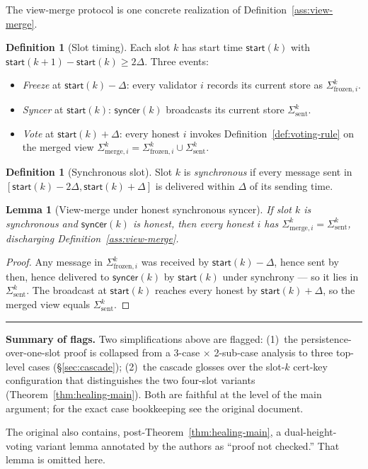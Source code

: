 \documentclass{article}
\newcommand{\start}{\mathsf{start}}
\newcommand{\syncer}{\mathsf{syncer}}
\theoremstyle{plain}
\newtheorem{lemma}[theorem]{Lemma}
\theoremstyle{definition}
\newtheorem{definition}[theorem]{Definition}
\theoremstyle{remark}
\renewcommand{\paragraph}[1]{\vspace{6pt}\noindent\textbf{#1}}
\begin{document}
The view-merge protocol is one concrete realization of Definition~\ref{ass:view-merge}.

\begin{definition}[Slot timing]\label{def:slot-timing}
Each slot $k$ has start time $\start(k)$ with $\start(k+1) - \start(k) \geq 2\Delta$. Three events:
\begin{itemize}
\item \emph{Freeze} at $\start(k) - \Delta$: every validator $i$ records its current store as $\Sigma^k_{\mathrm{frozen}, i}$.
\item \emph{Syncer} at $\start(k)$: $\syncer(k)$ broadcasts its current store $\Sigma^k_{\mathrm{sent}}$.
\item \emph{Vote} at $\start(k) + \Delta$: every honest $i$ invokes Definition~\ref{def:voting-rule} on the merged view $\Sigma^k_{\mathrm{merge}, i} = \Sigma^k_{\mathrm{frozen}, i} \cup \Sigma^k_{\mathrm{sent}}$.
\end{itemize}
\end{definition}

\begin{definition}[Synchronous slot]\label{def:sync-slot}
Slot $k$ is \emph{synchronous} if every message sent in $[\start(k) - 2\Delta, \start(k) + \Delta]$ is delivered within $\Delta$ of its sending time.
\end{definition}

\begin{lemma}[View-merge under honest synchronous syncer]\label{lem:view-merge}
If slot $k$ is synchronous and $\syncer(k)$ is honest, then every honest $i$ has $\Sigma^k_{\mathrm{merge}, i} = \Sigma^k_{\mathrm{sent}}$, discharging Definition~\ref{ass:view-merge}.
\end{lemma}

\begin{proof}[Proof]
Any message in $\Sigma^k_{\mathrm{frozen}, i}$ was received by $\start(k) - \Delta$, hence sent by then, hence delivered to $\syncer(k)$ by $\start(k)$ under synchrony --- so it lies in $\Sigma^k_{\mathrm{sent}}$. The broadcast at $\start(k)$ reaches every honest by $\start(k) + \Delta$, so the merged view equals $\Sigma^k_{\mathrm{sent}}$.
\end{proof}

\hrule\medskip

\paragraph{Summary of flags.} Two simplifications above are flagged: (1)~the persistence-over-one-slot proof is collapsed from a 3-case $\times$ 2-sub-case analysis to three top-level cases (\S\ref{sec:cascade}); (2)~the cascade glosses over the slot-$k$ cert-key configuration that distinguishes the two four-slot variants (Theorem~\ref{thm:healing-main}). Both are faithful at the level of the main argument; for the exact case bookkeeping see the original document.

The original also contains, post-Theorem~\ref{thm:healing-main}, a dual-height-voting variant lemma annotated by the authors as ``proof not checked.'' That lemma is omitted here.
\end{document}
